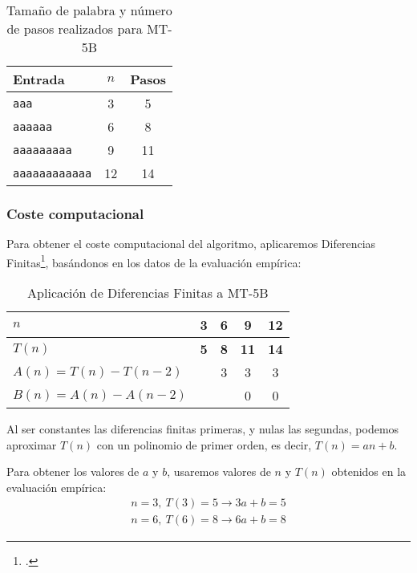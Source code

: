 \begin{table}[h]
    \centering
    \begin{tabular}{lcc}
        Entrada & $n$ & Pasos \\
        \hline
        \texttt{aaa}                &  3  & 5 \\
        \texttt{aaaaaa}             &  6  & 8 \\
        \texttt{aaaaaaaaa}          &  9  & 11 \\
        \texttt{aaaaaaaaaaaa}       & 12  & 14 \\
    \end{tabular}
    \caption{Tamaño de palabra y número de pasos realizados para MT-5B}
\end{table}


\subsubsection*{Coste computacional}
Para obtener el coste computacional del algoritmo, aplicaremos Diferencias Finitas\footcite[ver][pgs. 1-42: \textit{Chapter 1. Difference Tables and Polynomial Fits}]{cuoco2005mathematical}, basándonos en los datos de la evaluación empírica:

\begin{table}[H]
    \centering
    \begin{tabular}{|l|c|c|c|c|}
        \hline
        $n$    & \textbf{3} & \textbf{6} & \textbf{9}  & \textbf{12} \\ \hline
        $T(n)$ & \textbf{5} & \textbf{8} & \textbf{11} & \textbf{14} \\ \hline
        \hline
        $A(n) = T(n) - T(n-2)$ &   & 3 & 3 & 3 \\ \hline
        $B(n) = A(n) - A(n-2)$ &   &   & 0 & 0 \\ \hline
    \end{tabular}
    \caption{Aplicación de Diferencias Finitas a MT-5B}
\end{table}

Al ser constantes las diferencias finitas primeras, y nulas las segundas, podemos aproximar $T(n)$ con un polinomio de primer orden, es decir, $T(n) = an + b$.\medskip

Para obtener los valores de $a$ y $b$, usaremos valores de $n$ y $T(n)$ obtenidos en la evaluación empírica:
\begin{subequations}
    \begin{gather*}
        n = 3,\ T(3) = 5 \rightarrow 3a + b = 5 \\
        n = 6,\ T(6) = 8 \rightarrow 6a + b = 8
    \end{gather*}
\end{subequations}

